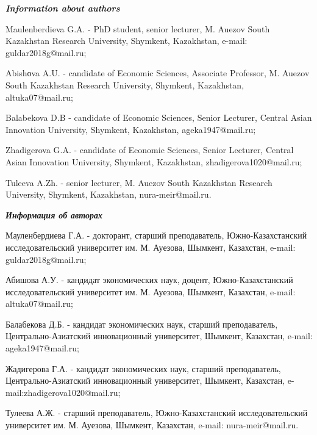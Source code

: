 \begin{info}
\hspace{1em}\emph{{\bfseries Information about authors}}

Maulenberdieva G.A. - PhD student, senior lecturer, M. Auezov South
Kazakhstan Research University, Shymkent, Kazakhstan, e-mail:
guldar2018g@mail.ru;

Abishоva A.U. - candidate of Economic Sciences, Associate Professor,
M.  Auezov South Kazakhstan Research University, Shymkent, Kazakhstan,
altuka07@mail.ru;

Balabekova D.B - candidate of Economic Sciences, Senior Lecturer,
Central Asian Innovation University, Shymkent, Kazakhstan,
ageka1947@mail.ru;

Zhadigerova G.A. - candidate of Economic Sciences, Senior Lecturer,
Central Asian Innovation University, Shymkent, Kazakhstan,
zhadigerova1020@mail.ru;

Tuleeva A.Zh. - senior lecturer, M. Auezov South Kazakhstan Research
University, Shymkent, Kazakhstan, nura-meir@mail.ru.

\hspace{1em}\emph{{\bfseries Информация об авторах}}

Мауленбердиева Г.А. - докторант, старший преподаватель,
Южно-Казахстанский исследовательский университет им. М. Ауезова,
Шымкент, Казахстан, e-mail: guldar2018g@mail.ru;

Абишова А.У. - кандидат экономических наук, доцент, Южно-Казахстанский
исследовательский университет им. М. Ауезова, Шымкент, Казахстан,
e-mail: altuka07@mail.ru;

Балабекова Д.Б. - кандидат экономических наук, старший преподаватель,
Центрально-Азиатский инновационный университет, Шымкент, Казахстан,
e-mail: ageka1947@mail.ru;

Жадигерова Г.А.  - кандидат экономических наук, старший преподаватель,
Центрально-Азиатский инновационный университет, Шымкент, Казахстан,
e-mail:zhadigerova1020@mail.ru;

Тулеева А.Ж. - старший преподаватель, Южно-Казахстанский
исследовательский университет им. М. Ауезова, Шымкент, Казахстан,
e-mail: nura-meir@mail.ru.
\end{info}
